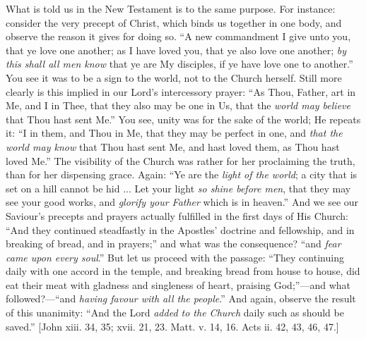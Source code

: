 What is told us in the New Testament is to the same purpose. For
instance: consider the very precept of Christ, which binds us together
in one body, and observe the reason it gives for doing so. ``A new
commandment I give unto you, that ye love one another; as I have loved
you, that ye also love one another; \emph{by this shall all men know}
that ye are My disciples, if ye have love one to another.'' You
see it was to be a sign to the world, not to the Church herself. Still
more clearly is this implied in our Lord's intercessory prayer: ``As Thou, Father, art in Me, and I in Thee, that they also may be
one in Us, that the \emph{world may believe} that Thou hast sent
Me.'' You see, unity was for the sake of the world; He repeats it:
``I in them, and Thou in Me, that they may be perfect in one, and \emph{that
the world may know} that Thou hast sent Me, and hast loved them, as
Thou hast loved Me.'' The visibility of the Church was rather for
her proclaiming the truth, than for her dispensing grace. Again:
``Ye are the \emph{light of the world}; a city that is set on a
hill cannot be hid ... Let your light \emph{so shine before men}, that
they may see your good works, and \emph{glorify your Father} which is
in heaven.'' And we see our Saviour's precepts and prayers
actually fulfilled in the first days of His Church: ``And they
continued steadfastly in the Apostles' doctrine and fellowship, and in
breaking of bread, and in prayers;'' and what was the consequence?
``and \emph{fear came upon every soul}.'' But let us proceed
with the passage: ``They continuing daily with one accord in the
temple, and breaking bread from house to house, did eat their meat
with gladness and singleness of heart, praising God;''—and what
followed?—``and \emph{having favour with all the people}.''
And again, observe the result of this unanimity: ``And the Lord \emph{added
to the Church} daily such as should be saved.'' [John xiii. 34,
35; xvii. 21, 23. Matt. v. 14, 16. Acts ii. 42, 43, 46, 47.]

